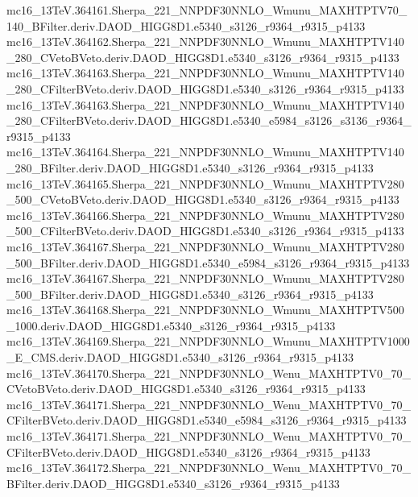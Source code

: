 \begin{scriptsize}
mc16\_13TeV.364161.Sherpa\_221\_NNPDF30NNLO\_Wmunu\_MAXHTPTV70\_140\_BFilter.deriv.DAOD\_HIGG8D1.e5340\_s3126\_r9364\_r9315\_p4133 \\
mc16\_13TeV.364162.Sherpa\_221\_NNPDF30NNLO\_Wmunu\_MAXHTPTV140\_280\_CVetoBVeto.deriv.DAOD\_HIGG8D1.e5340\_s3126\_r9364\_r9315\_p4133 \\
mc16\_13TeV.364163.Sherpa\_221\_NNPDF30NNLO\_Wmunu\_MAXHTPTV140\_280\_CFilterBVeto.deriv.DAOD\_HIGG8D1.e5340\_s3126\_r9364\_r9315\_p4133 \\
mc16\_13TeV.364163.Sherpa\_221\_NNPDF30NNLO\_Wmunu\_MAXHTPTV140\_280\_CFilterBVeto.deriv.DAOD\_HIGG8D1.e5340\_e5984\_s3126\_s3136\_r9364\_r9315\_p4133 \\
mc16\_13TeV.364164.Sherpa\_221\_NNPDF30NNLO\_Wmunu\_MAXHTPTV140\_280\_BFilter.deriv.DAOD\_HIGG8D1.e5340\_s3126\_r9364\_r9315\_p4133 \\
mc16\_13TeV.364165.Sherpa\_221\_NNPDF30NNLO\_Wmunu\_MAXHTPTV280\_500\_CVetoBVeto.deriv.DAOD\_HIGG8D1.e5340\_s3126\_r9364\_r9315\_p4133 \\
mc16\_13TeV.364166.Sherpa\_221\_NNPDF30NNLO\_Wmunu\_MAXHTPTV280\_500\_CFilterBVeto.deriv.DAOD\_HIGG8D1.e5340\_s3126\_r9364\_r9315\_p4133 \\
mc16\_13TeV.364167.Sherpa\_221\_NNPDF30NNLO\_Wmunu\_MAXHTPTV280\_500\_BFilter.deriv.DAOD\_HIGG8D1.e5340\_e5984\_s3126\_r9364\_r9315\_p4133 \\
mc16\_13TeV.364167.Sherpa\_221\_NNPDF30NNLO\_Wmunu\_MAXHTPTV280\_500\_BFilter.deriv.DAOD\_HIGG8D1.e5340\_s3126\_r9364\_r9315\_p4133 \\
mc16\_13TeV.364168.Sherpa\_221\_NNPDF30NNLO\_Wmunu\_MAXHTPTV500\_1000.deriv.DAOD\_HIGG8D1.e5340\_s3126\_r9364\_r9315\_p4133 \\
mc16\_13TeV.364169.Sherpa\_221\_NNPDF30NNLO\_Wmunu\_MAXHTPTV1000\_E\_CMS.deriv.DAOD\_HIGG8D1.e5340\_s3126\_r9364\_r9315\_p4133 \\
mc16\_13TeV.364170.Sherpa\_221\_NNPDF30NNLO\_Wenu\_MAXHTPTV0\_70\_CVetoBVeto.deriv.DAOD\_HIGG8D1.e5340\_s3126\_r9364\_r9315\_p4133 \\
mc16\_13TeV.364171.Sherpa\_221\_NNPDF30NNLO\_Wenu\_MAXHTPTV0\_70\_CFilterBVeto.deriv.DAOD\_HIGG8D1.e5340\_e5984\_s3126\_r9364\_r9315\_p4133 \\
mc16\_13TeV.364171.Sherpa\_221\_NNPDF30NNLO\_Wenu\_MAXHTPTV0\_70\_CFilterBVeto.deriv.DAOD\_HIGG8D1.e5340\_s3126\_r9364\_r9315\_p4133 \\
mc16\_13TeV.364172.Sherpa\_221\_NNPDF30NNLO\_Wenu\_MAXHTPTV0\_70\_BFilter.deriv.DAOD\_HIGG8D1.e5340\_s3126\_r9364\_r9315\_p4133 \\

\end{scriptsize}
